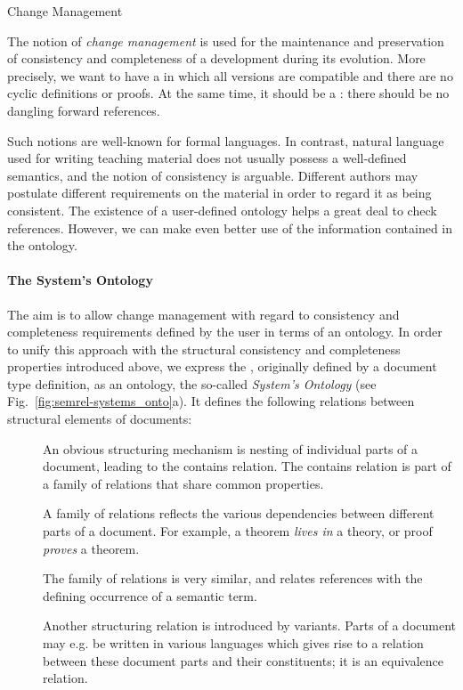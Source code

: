 \begin{omgroup}[id=MMiSS,creators={bkb,amahnke}]
\begin{omgroup}{Change Management}

The notion of \emph{change management} is used for the maintenance and preservation of
consistency and completeness of a development during its evolution.  More precisely, we
want to have a {} in which all versions are compatible
and there are no cyclic definitions or proofs.  At the same time, it should be a
{}: there should be no dangling forward references.

Such notions are well-known for formal languages. In contrast, natural language used for
writing teaching material does not usually possess a well-defined semantics, and the
notion of consistency is arguable.  Different authors may postulate different requirements
on the material in order to regard it as being consistent.  The existence of a
user-defined ontology helps a great deal to check references. However, we can make even
better use of the information contained in the ontology.

\paragraph{The System's Ontology}

The aim is to allow change management with regard to consistency and completeness
requirements defined by the user in terms of an ontology. In order to unify this approach
with the structural consistency and completeness properties introduced above, we express
the {}, originally defined by a document type definition, as
an ontology, the so-called \emph{System's Ontology} (see
Fig.~\ref{fig:semrel-systems_onto}a).  It defines the following relations between
structural elements of documents:
\begin{description}
\item [{}] An obvious structuring mechanism is nesting of individual
  parts of a document, leading to the contains relation. The contains relation is part of
  a family of {} relations that share common properties.
\item [{}] A family of {} relations reflects the
  various dependencies between different parts of a document.  For example, a theorem
  \emph{lives in} a theory, or proof \emph{proves} a theorem.
\item [{}] The family of {} relations is very similar,
  and relates references with the defining occurrence of a semantic term.
\item [{}] Another structuring relation is introduced by
  variants. Parts of a document may e.g. be written in various languages which gives rise
  to a {} relation between these document parts and their constituents;
  it is an equivalence relation.
\end{description}


\end{omgroup}
\end{omgroup}

